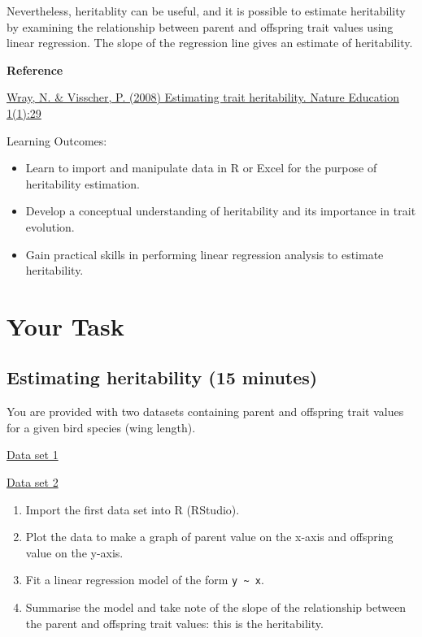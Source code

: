 \documentclass[
  a4paper]{book}
\providecommand{\tightlist}{%
  \setlength{\itemsep}{0pt}\setlength{\parskip}{0pt}}
\begin{document}
Nevertheless, heritablity can be useful, and it is possible to estimate heritability by examining the relationship between parent and offspring trait values using linear regression. The slope of the regression line gives an estimate of heritability.

\textbf{Reference}

\href{https://www.nature.com/scitable/topicpage/estimating-trait-heritability-46889/}{Wray, N. \& Visscher, P. (2008) Estimating trait heritability. Nature Education 1(1):29}

\begin{do-something}
Learning Outcomes:

\begin{itemize}
\tightlist
\item
  Learn to import and manipulate data in R or Excel for the purpose of
  heritability estimation.
\item
  Develop a conceptual understanding of heritability and its importance
  in trait evolution.
\item
  Gain practical skills in performing linear regression analysis to
  estimate heritability.
\end{itemize}
\end{do-something}

\hypertarget{your-task-11}{%
\section{Your Task}\label{your-task-11}}

\hypertarget{estimating-heritability-15-minutes}{%
\subsection{Estimating heritability (15 minutes)}\label{estimating-heritability-15-minutes}}

You are provided with two datasets containing parent and offspring trait values for a given bird species (wing length).

\href{https://www.dropbox.com/scl/fi/8oe1can46pshxojw1p29m/heritability_pop1.csv?rlkey=ssg6ymzr85gkrzw9e1y63ghzu\&dl=0}{Data set 1}

\href{https://www.dropbox.com/scl/fi/yoy0x7kczvlr1eku5057m/heritability_pop2.csv?rlkey=30hta1di8v6w93ghbhq09dlbm\&dl=0}{Data set 2}

\begin{enumerate}
\def\labelenumi{\arabic{enumi})}
\tightlist
\item
  Import the first data set into R (RStudio).
\item
  Plot the data to make a graph of parent value on the x-axis and offspring value on the y-axis.
\item
  Fit a linear regression model of the form \texttt{y\ \textasciitilde{}\ x}.
\item
  Summarise the model and take note of the slope of the relationship between the parent and offspring trait values: this is the heritability.
\end{enumerate}
\end{document}
